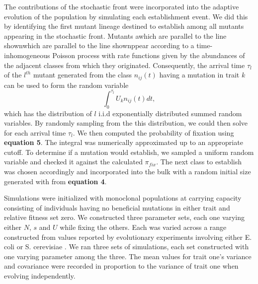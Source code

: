 \documentclass[11pt,twocolumn]{article}
\begin{document}
The contributions of the stochastic front were incorporated into the adaptive evolution of the population by simulating each establishment event.  We did this by identifying the first mutant lineage destined to establish among all mutants appearing in the stochastic front.  Mutants awhich are parallel to the line shownwhich are parallel to the line shownppear according to a time-inhomogeneous Poisson process with rate functions given by the abundances of the adjacent classes from which they originated. Consequently, the arrival time $\tau_l$ of the $l^{th}$ mutant generated from the class $n_{ij}(t)$ having a mutation in trait $k$ can be used to form the random variable
% 
% 
\[ 
\int_0^{\tau_l} U_k n_{ij}(t) dt ,
\] 
which has the distribution of $l$ i.i.d exponentially distributed summed random variables. By randomly sampling from the this distribution, we could then solve for each arrival time $\tau_l$.   We then computed the probability of fixation using \textbf{equation 5}.  The integral was numerically approximated up to an appropriate cutoff.  To determine if a mutation would establish, we sampled a uniform random variable and checked it against the calculated $\pi_{fix}$. The next class to establish was chosen accordingly and incorporated into the bulk with a random initial size generated with from \textbf{equation 4}.\par
% 
% 

Simulations were initialized with monoclonal populations at carrying capacity consisting of individuals having no beneficial mutations in either trait and relative fitness set zero. We constructed three parameter sets, each one varying either $N$, $s$ and $U$ while fixing the others. Each was varied across a range constructed from values reported by evolutionary experiments involving either E. coli or S. cerevisiae \citep{desai2007speed,Levy2015,Perfeito2007}. We ran three sets of simulations, each set constructed with one varying parameter among the three. The mean values for trait one's variance and covariance were recorded in proportion to the variance of trait one when evolving independently.  
\end{document}
